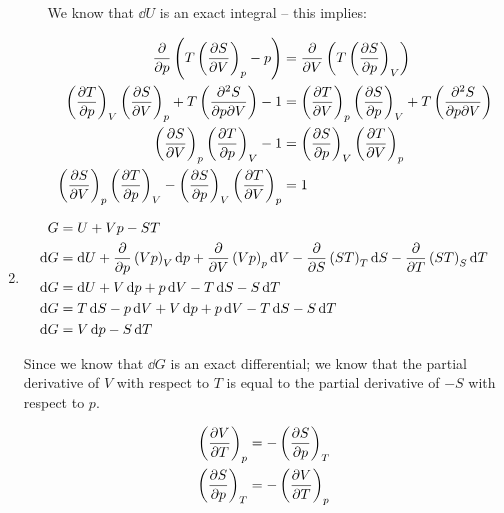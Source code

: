 \documentclass[10pt,\jkfside,a4paper]{article}
\begin{document}
\begin{enumerate}
\begin{enumerate}
We know that $\dd{U}$ is an exact integral -- this implies:

\begin{equation}
\begin{split}
\pdv{p}\left(T\left(\pdv{S}{V}\right)_p - p\right) &= \pdv{V}\left(T\left(\pdv{S}{p}\right)_V\right) \\
\left(\pdv{T}{p}\right)_V\left(\pdv{S}{V}\right)_p +  T\left(\pdv[2]{S}{p}{V}\right) - 1 &= \left(\pdv{T}{V}\right)_p\left(\pdv{S}{p}\right)_V + T\left(\pdv[2]{S}{p}{V}\right) \\
\left(\pdv{S}{V}\right)_p\left(\pdv{T}{p}\right)_V - 1 &= \left(\pdv{S}{p}\right)_V\left(\pdv{T}{V}\right)_p \\
\left(\pdv{S}{V}\right)_p\left(\pdv{T}{p}\right)_V - \left(\pdv{S}{p}\right)_V\left(\pdv{T}{V}\right)_p &= 1 \\
\end{split}
\end{equation}

\end{enumerate}

\item 

\begin{equation}
\begin{split}
G &= U + Vp - ST \\
\dd{G} &=  \dd{U} + \pdv{p}\left(Vp\right)_V\dd{p} + \pdv{V}\left(Vp\right)_p\dd{V} - \pdv{S}\left(ST\right)_T\dd{S} - \pdv{T}\left(ST\right)_S\dd{T} \\
\dd{G} &= \dd{U} + V\dd{p} + p\dd{V} - T\dd{S} - S\dd{T} \\
\dd{G} &= T\dd{S} - p\dd{V} + V\dd{p} + p\dd{V} - T\dd{S} - S\dd{T} \\
\dd{G} &= V\dd{p} - S\dd{T} \\
\end{split}
\end{equation}

Since we know that $\dd{G}$ is an exact differential; we know that 
the partial derivative of $V$ with respect to $T$ is equal to the partial derivative of $-S$ with 
respect to $p$.

\begin{equation}
\begin{split}
\left(\pdv{V}{T}\right)_p &= -\left(\pdv{S}{p}\right)_T \\
\left(\pdv{S}{p}\right)_T &= -\left(\pdv{V}{T}\right)_p \\
\end{split}
\end{equation}


\end{enumerate}
\end{document}

